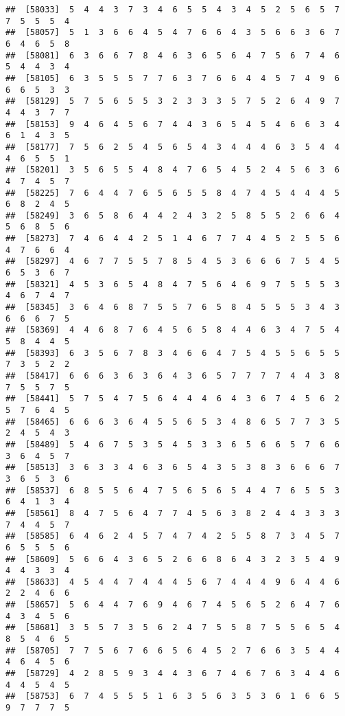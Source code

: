 \documentclass[
]{book}
\begin{document}
\begin{verbatim}
##  [58033]  5  4  4  3  7  3  4  6  5  5  4  3  4  5  2  5  6  5  7  7  5  5  5  4
##  [58057]  5  1  3  6  6  4  5  4  7  6  6  4  3  5  6  6  3  6  7  6  4  6  5  8
##  [58081]  6  3  6  6  7  8  4  6  3  6  5  6  4  7  5  6  7  4  6  5  4  4  3  4
##  [58105]  6  3  5  5  5  7  7  6  3  7  6  6  4  4  5  7  4  9  6  6  6  5  3  3
##  [58129]  5  7  5  6  5  5  3  2  3  3  3  5  7  5  2  6  4  9  7  4  4  3  7  7
##  [58153]  9  4  6  4  5  6  7  4  4  3  6  5  4  5  4  6  6  3  4  6  1  4  3  5
##  [58177]  7  5  6  2  5  4  5  6  5  4  3  4  4  4  6  3  5  4  4  4  6  5  5  1
##  [58201]  3  5  6  5  5  4  8  4  7  6  5  4  5  2  4  5  6  3  6  4  7  4  5  7
##  [58225]  7  6  4  4  7  6  5  6  5  5  8  4  7  4  5  4  4  4  5  6  8  2  4  5
##  [58249]  3  6  5  8  6  4  4  2  4  3  2  5  8  5  5  2  6  6  4  5  6  8  5  6
##  [58273]  7  4  6  4  4  2  5  1  4  6  7  7  4  4  5  2  5  5  6  4  7  6  6  4
##  [58297]  4  6  7  7  5  5  7  8  5  4  5  3  6  6  6  7  5  4  5  6  5  3  6  7
##  [58321]  4  5  3  6  5  4  8  4  7  5  6  4  6  9  7  5  5  5  3  4  6  7  4  7
##  [58345]  3  6  4  6  8  7  5  5  7  6  5  8  4  5  5  5  3  4  3  6  6  6  7  5
##  [58369]  4  4  6  8  7  6  4  5  6  5  8  4  4  6  3  4  7  5  4  5  8  4  4  5
##  [58393]  6  3  5  6  7  8  3  4  6  6  4  7  5  4  5  5  6  5  5  7  3  5  2  2
##  [58417]  6  6  6  3  6  3  6  4  3  6  5  7  7  7  7  4  4  3  8  7  5  5  7  5
##  [58441]  5  7  5  4  7  5  6  4  4  4  6  4  3  6  7  4  5  6  2  5  7  6  4  5
##  [58465]  6  6  6  3  6  4  5  5  6  5  3  4  8  6  5  7  7  3  5  2  4  5  4  3
##  [58489]  5  4  6  7  5  3  5  4  5  3  3  6  5  6  6  5  7  6  6  3  6  4  5  7
##  [58513]  3  6  3  3  4  6  3  6  5  4  3  5  3  8  3  6  6  6  7  3  6  5  3  6
##  [58537]  6  8  5  5  6  4  7  5  6  5  6  5  4  4  7  6  5  5  3  6  4  1  3  4
##  [58561]  8  4  7  5  6  4  7  7  4  5  6  3  8  2  4  4  3  3  3  7  4  4  5  7
##  [58585]  6  4  6  2  4  5  7  4  7  4  2  5  5  8  7  3  4  5  7  6  5  5  5  6
##  [58609]  5  6  6  4  3  6  5  2  6  6  8  6  4  3  2  3  5  4  9  4  4  3  3  4
##  [58633]  4  5  4  4  7  4  4  4  5  6  7  4  4  4  9  6  4  4  6  2  2  4  6  6
##  [58657]  5  6  4  4  7  6  9  4  6  7  4  5  6  5  2  6  4  7  6  4  3  4  5  6
##  [58681]  3  5  5  7  3  5  6  2  4  7  5  5  8  7  5  5  6  5  4  8  5  4  6  5
##  [58705]  7  7  5  6  7  6  6  5  6  4  5  2  7  6  6  3  5  4  4  4  6  4  5  6
##  [58729]  4  2  8  5  9  3  4  4  3  6  7  4  6  7  6  3  4  4  6  4  4  5  4  5
##  [58753]  6  7  4  5  5  5  1  6  3  5  6  3  5  3  6  1  6  6  5  9  7  7  7  5

\end{verbatim}
\end{document}
